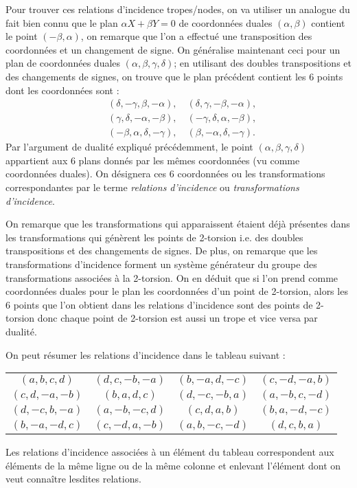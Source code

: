 \documentclass[a4paper]{article}
\theoremstyle{definition}
\theoremstyle{remark}
\numberwithin{equation}{section}
\begin{document}
Pour trouver ces relations d'incidence tropes/nodes, on va utiliser un analogue du fait bien connu que le plan $\alpha X + \beta Y=0$ de coordonnées duales $(\alpha,\beta)$ contient le point $(-\beta, \alpha)$, on remarque que l'on a effectué une transposition des coordonnées et un changement de signe.
On généralise maintenant ceci pour un plan de coordonnées duales $(\alpha, \beta, \gamma, \delta)$; en utilisant des doubles transpositions et des changements de signes, on trouve que le plan précédent contient les 6 points dont les coordonnées sont :
\begin{align*}
   &(\delta, -\gamma, \beta, -\alpha), \quad (\delta, \gamma, -\beta, -\alpha), \\
   &(\gamma, \delta, -\alpha, -\beta), \quad (-\gamma, \delta, \alpha, -\beta), \\
   &(-\beta, \alpha, \delta, -\gamma), \quad (\beta, -\alpha, \delta, -\gamma).
\end{align*}
Par l'argument de dualité expliqué précédemment, le point $(\alpha, \beta, \gamma, \delta)$ appartient aux 6 plans donnés par les mêmes coordonnées (vu comme coordonnées duales).
On désignera ces 6 coordonnées ou les transformations correspondantes par le terme \emph{relations d'incidence} ou \emph{transformations d'incidence}.

On remarque que les transformations qui apparaissent étaient déjà présentes dans les transformations qui génèrent les points de 2-torsion i.e. des doubles transpositions et des changements de signes. De plus, on remarque que les transformations d'incidence forment un système générateur du groupe des transformations associées à la 2-torsion.
On en déduit que si l'on prend comme coordonnées duales pour le plan les coordonnées d'un point de 2-torsion, alors les 6 points que l'on obtient dans les relations d'incidence sont des points de 2-torsion donc chaque point de 2-torsion est aussi un trope et vice versa par dualité.

On peut résumer les relations d'incidence dans le tableau suivant :
\begin{center}
\begin{tabular}{ c c c c }
   $(a,b,c,d)$   & $(d,c,-b,-a)$ & $(b,-a,d,-c)$ & $(c,-d,-a,b)$ \\
   $(c,d,-a,-b)$ & $(b,a,d,c)$ & $(d,-c,-b,a)$ & $(a,-b,c,-d)$ \\
   $(d,-c,b,-a)$ & $(a,-b,-c,d)$ & $(c,d,a,b)$ & $(b,a,-d,-c)$ \\
   $(b,-a,-d,c)$ &  $(c,-d,a,-b)$ & $(a,b,-c,-d)$ & $(d, c, b, a)$
 \end{tabular}
\end{center}
Les relations d'incidence associées à un élément du tableau correspondent aux éléments de la même ligne ou de la même colonne et enlevant l'élément dont on veut connaître lesdites relations.
\end{document}
